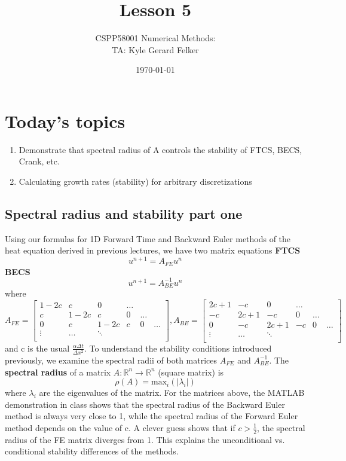 \documentclass[11pt]{article}
\begin{document}
\title{Lesson 5} 
\author{CSPP58001 Numerical Methods: \\ TA: Kyle Gerard Felker}
\date{\today}
\maketitle

\section{Today's topics}
\begin{enumerate}
\item Demonstrate that spectral radius of A controls the stability of FTCS, BECS, Crank, etc.
\item Calculating growth rates (stability) for arbitrary discretizations
\end{enumerate}

\subsection{Spectral radius and stability part one}
Using our formulas for 1D Forward Time and Backward Euler methods of the heat equation derived in previous lectures, we have two matrix equations
{\bf FTCS}
$$u^{n+1} = A_{FE}u^n$$
{\bf BECS}
$$u^{n+1} = A_{BE}^{-1}u^n$$
where 
$$ A_{FE} = \begin{bmatrix}
1-2c & c & 0 &  \ldots \\
c & 1-2c & c & 0 & \ldots \\
0 & c & 1-2c & c & 0 & \ldots \\
\vdots & \ldots & \ddots \\
\end{bmatrix}, A_{BE} = \begin{bmatrix}
2c + 1 & -c & 0 &  \ldots \\
-c & 2c+1 & -c & 0 & \ldots \\
0 & -c & 2c+1 & -c & 0 & \ldots \\
\vdots & \ldots & \ddots \\
\end{bmatrix} $$
and c is the usual $\frac{\alpha \Delta t}{\Delta x^2}$. To understand the stability conditions introduced previously, we examine the spectral radii of both matrices $A_{FE}$ and $A_{BE}^{-1}$. 
 The {\bf spectral radius} of a matrix $A \colon \mathbb{R}^n \to \mathbb{R}^n$ (square matrix) is 
$$ \rho(A) = \text{max}_i(|\lambda_i|) $$
where $\lambda_i$ are the eigenvalues of the matrix. For the matrices above, the MATLAB demonstration in class shows that the spectral radius of the Backward Euler method is always very close to 1, while the spectral radius of the Forward Euler method depends on the value of c. A clever guess shows that if $c > \frac{1}{2}$, the spectral radius of the FE matrix diverges from 1. This explains the unconditional vs. conditional stability differences of the methods. 
\end{document}
